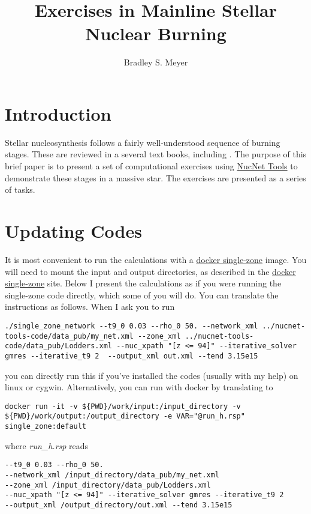 \documentclass[manuscript]{aastex62}
\title{Exercises in Mainline Stellar Nuclear Burning}
\author{Bradley S. Meyer}
\affil{Department of Physics and Astronomy, Clemson University, Clemson, SC 29634-0978}
\begin{document}
\section{Introduction}

Stellar nucleosynthesis follows a fairly well-understood sequence of burning
stages.  These are reviewed in a several text books, including
\cite{1983psen.book.....C,1996snai.book.....A,2007nps..book.....I}.
The purpose of this brief paper is to present a set of computational
exercises using
\href{http://sourceforge.net/projects/nucnet-tools/}{NucNet Tools}
to demonstrate these stages in a massive star.
The exercises are presented as a series of tasks.

\section{Updating Codes} \label{sec:docker}

It is most convenient to run the calculations with a
\href{http://github.com/mbradle/docker_single_zone}{docker single-zone}
image.  You will need to mount the input and output directories, as
described in the
\href{http://github.com/mbradle/docker_single_zone}{docker single-zone}
site.  Below I present the calculations as if you were running the single-zone
code directly, which some of you will do.  You can translate the instructions
as follows.  When I ask you to run
\begin{lstlisting}
./single_zone_network --t9_0 0.03 --rho_0 50. --network_xml ../nucnet-tools-code/data_pub/my_net.xml --zone_xml ../nucnet-tools-code/data_pub/Lodders.xml --nuc_xpath "[z <= 94]" --iterative_solver gmres --iterative_t9 2  --output_xml out.xml --tend 3.15e15
\end{lstlisting}
you can directly run this if you've installed the codes (usually with my help)
on linux or cygwin.  Alternatively, you can run with docker by translating to
\begin{lstlisting}
docker run -it -v ${PWD}/work/input:/input_directory -v ${PWD}/work/output:/output_directory -e VAR="@run_h.rsp" single_zone:default
\end{lstlisting}
where {\it run\_h.rsp} reads
\begin{verbatim}
--t9_0 0.03 --rho_0 50.
--network_xml /input_directory/data_pub/my_net.xml
--zone_xml /input_directory/data_pub/Lodders.xml
--nuc_xpath "[z <= 94]" --iterative_solver gmres --iterative_t9 2
--output_xml /output_directory/out.xml --tend 3.15e15
\end{verbatim}
\end{document}
